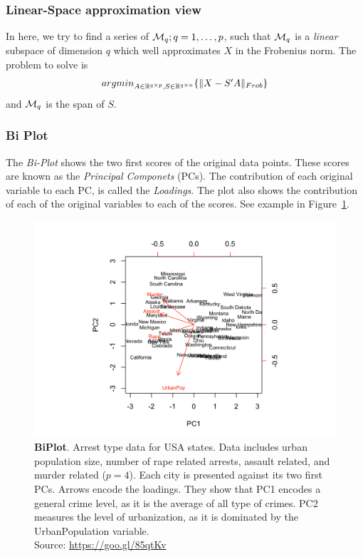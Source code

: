 \documentclass[12pt,a4paper]{article}
\begin{document}
\subsubsection{Linear-Space approximation view}

In here, we try to find a series of $\mathcal{M}_q; q=1,\dots,p$, such that $\mathcal{M}_q$ is a \emph{linear} subspace of dimension $q$ which well approximates $X$ in the Frobenius norm. 
The problem to solve is 
\begin{align}
\label{eq:pca-dim-reduce}
	\textstyle{\mathop{argmin}_{A\in \mathbb{R}^{q \times p}, S\in \mathbb{R}^{q \times n}}}\{ \Vert X- S'A \Vert_{Frob} \}
\end{align}
and $\mathcal{M}_q$ is the span of $S$.



\subsubsection{Bi Plot}
\label{sec:bi_plot}
The \emph{Bi-Plot} shows the two first scores of the original data points.
These scores are known as the \emph{Principal Componets} (PCs). 
The contribution of each original variable to each PC, is called the \emph{Loadings}.
The plot also shows the contribution of each of the original variables to each of the scores. 
See example in Figure~\ref{fig:usaarrests}.


\begin{figure}[ht]
	\centering
	\includegraphics[width=0.7\linewidth]{USAarrests}
	\caption{\textbf{BiPlot}.
		Arrest type data for USA states. 
		Data includes urban population size, number of rape related arrests, assault related, and murder related ($p=4$). 
		Each city is presented against its two first PCs. 
		Arrows encode the loadings. 
		They show that PC1 encodes a general crime level, as it is the average of all type of crimes. 
		PC2 measures the level of urbanization, as it is dominated by the UrbanPopulation variable. 		
		\\ Source: \url{https://goo.gl/85qtKv}}
	\label{fig:usaarrests}
\end{figure}
\end{document}
